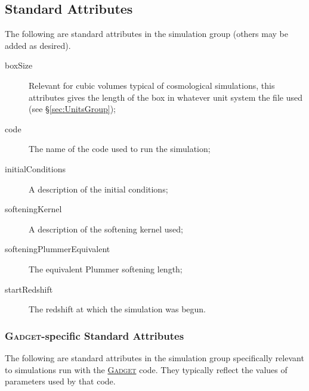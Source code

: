 \subsection{Standard Attributes}

The following are standard attributes in the {\normalfont \ttfamily simulation} group (others may be added as desired).

\begin{description}
 \item [{\normalfont \ttfamily boxSize}] Relevant for cubic volumes typical of cosmological simulations, this attributes gives the length of the box in whatever unit system the file used (see \S\ref{sec:UnitsGroup});
 \item [{\normalfont \ttfamily code}] The name of the code used to run the simulation;
 \item [{\normalfont \ttfamily initialConditions}] A description of the initial conditions;
 \item [{\normalfont \ttfamily softeningKernel}] A description of the softening kernel used;
 \item [{\normalfont \ttfamily softeningPlummerEquivalent}] The equivalent Plummer softening length;
 \item [{\normalfont \ttfamily startRedshift}] The redshift at which the simulation was begun.
\end{description}

\subsubsection{{\normalfont \scshape Gadget}-specific Standard Attributes}

The following are standard attributes in the {\normalfont \ttfamily simulation} group specifically relevant to simulations run with the \href{http://www.mpa-garching.mpg.de/gadget/}{{\normalfont \scshape Gadget}} code. They typically reflect the values of parameters used by that code.

